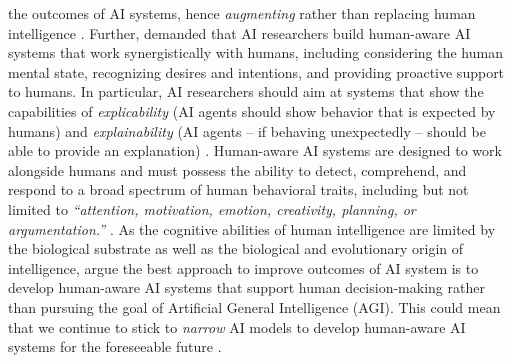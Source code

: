 the outcomes of AI systems,  hence \textit{augmenting} rather than replacing human intelligence \citep{schmidtAugmentingHumanIntellect2017,
akataResearchAgendaHybrid2020a}. Further, \cite{kambhampatiChallengesHumanAwareAI2020} demanded that AI researchers build human-aware AI
systems that work synergistically with humans, including considering the human mental state, recognizing desires and intentions,
and providing proactive support to humans. In particular, AI researchers should aim at systems that show the capabilities of
\textit{explicability} (AI agents should show behavior that is expected by humans) and \textit{explainability} (AI agents -- 
if behaving unexpectedly -- should be able to provide an explanation) \citep{kambhampatiChallengesHumanAwareAI2020}.
Human-aware AI systems are designed to work alongside humans and must possess the ability to detect, comprehend, and respond
to a broad spectrum of human behavioral traits, including but not limited to \textit{``attention, motivation, emotion, creativity,
planning, or argumentation.''} \citep{kortelingHumanArtificialIntelligence2021}. As the cognitive abilities of human intelligence
are limited by the biological substrate as well as the biological and evolutionary origin of intelligence,
\cite{kortelingHumanArtificialIntelligence2021} argue the best approach to improve outcomes of AI system is to develop
human-aware AI systems that support human decision-making rather than pursuing the goal of Artificial General Intelligence (AGI).
This could mean that we continue to stick to \textit{narrow} AI models to develop human-aware AI systems for the foreseeable
future \citep{kortelingHumanArtificialIntelligence2021}.

